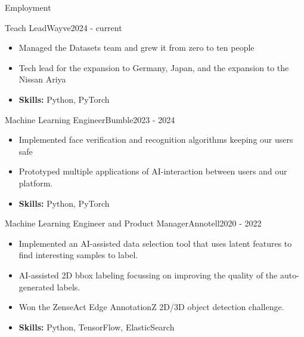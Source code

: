 \documentclass[]{mcdowellcv}
\begin{document}
	\begin{cvsection}{Employment}
		\begin{cvsubsection}{Teach Lead}{Wayve}{2024 - current}
			\begin{itemize}
				\item Managed the Datasets team and grew it from zero to ten people
				\item Tech lead for the expansion to Germany, Japan, and the expansion to the Nissan Ariya
				\item \textbf{Skills:} Python,  PyTorch
			\end{itemize}
		\end{cvsubsection}
		

		\begin{cvsubsection}{Machine Learning Engineer}{Bumble}{2023 - 2024}
			\begin{itemize}
				\item Implemented face verification and recognition algorithms keeping our users safe
				\item Prototyped multiple applications of AI-interaction between users and our platform. 
				\item \textbf{Skills:} Python, PyTorch
			\end{itemize}
		\end{cvsubsection}
		

		\begin{cvsubsection}{Machine Learning Engineer and Product Manager}{Annotell}{2020 - 2022}
			\begin{itemize}
				\item Implemented an AI-assisted data selection tool that uses latent features to find interesting samples to label. 
				\item AI-assisted 2D bbox labeling focussing on improving the quality of the auto-generated labels. 
				\item Won the ZenseAct Edge AnnotationZ 2D/3D object detection challenge. 
				\item \textbf{Skills:} Python,  TensorFlow,  ElasticSearch
			\end{itemize}
		\end{cvsubsection}
		

\end{cvsection}
\end{document}
